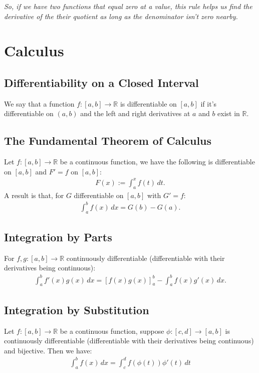 \documentclass[a4paper, 12pt, twoside]{article}
\begin{document}
\textit{So, if we have two functions that equal zero at a value, this
      rule helps us find the derivative of the their quotient as long
      as the denominator isn't zero nearby.}

\section{Calculus}

\subsection{Differentiability on a Closed Interval}

We say that a function $f:[a, b] \to \mathbb{R}$ is differentiable on $[a, b]$
if it's differentiable on $(a, b)$ and the left and right derivatives at $a$
and $b$ exist in $\mathbb{R}$.

\subsection{The Fundamental Theorem of Calculus}

Let $f:[a, b] \to \mathbb{R}$ be a continuous function, we have the following
is differentiable on $[a, b]$ and $F' = f$ on $[a, b]$:
\begin{align*}
      F(x) := \int_a^x f(t) \, dt.
\end{align*}
A result is that, for $G$ differentiable on $[a, b]$ with $G' = f$:
\begin{align*}
      \int_a^b f(x) \, dx = G(b) - G(a).
\end{align*}

\subsection{Integration by Parts}

For $f, g : [a, b] \to \mathbb{R}$ continuously differentiable (differentiable
with their derivatives being continuous):
\begin{align*}
      \int_a^b f'(x)g(x) \, dx = [f(x)g(x)]_a^b - \int_a^b f(x)g'(x) \, dx.
\end{align*}

\subsection{Integration by Substitution}

Let $f:[a, b] \to \mathbb{R}$ be a continuous function, suppose $\phi:
      [c, d] \to [a, b]$ is continuously differentiable (differentiable
with their derivatives being continuous) and bijective. Then we
have:
\begin{align*}
      \int_a^b f(x) \, dx = \int_c^d f(\phi(t))\phi'(t) \, dt
\end{align*}
\end{document}
